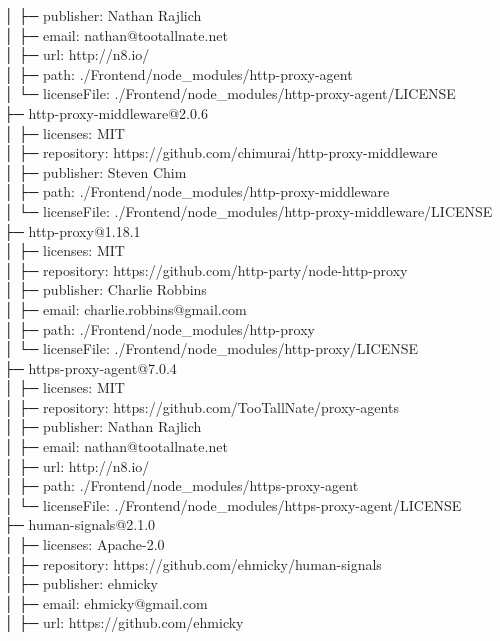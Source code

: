│  ├─ publisher: Nathan Rajlich\\
│  ├─ email: nathan@tootallnate.net\\
│  ├─ url: http://n8.io/\\
│  ├─ path: ./Frontend/node\_modules/http-proxy-agent\\
│  └─ licenseFile: ./Frontend/node\_modules/http-proxy-agent/LICENSE\\
├─ http-proxy-middleware@2.0.6\\
│  ├─ licenses: MIT\\
│  ├─ repository: https://github.com/chimurai/http-proxy-middleware\\
│  ├─ publisher: Steven Chim\\
│  ├─ path: ./Frontend/node\_modules/http-proxy-middleware\\
│  └─ licenseFile: ./Frontend/node\_modules/http-proxy-middleware/LICENSE\\
├─ http-proxy@1.18.1\\
│  ├─ licenses: MIT\\
│  ├─ repository: https://github.com/http-party/node-http-proxy\\
│  ├─ publisher: Charlie Robbins\\
│  ├─ email: charlie.robbins@gmail.com\\
│  ├─ path: ./Frontend/node\_modules/http-proxy\\
│  └─ licenseFile: ./Frontend/node\_modules/http-proxy/LICENSE\\
├─ https-proxy-agent@7.0.4\\
│  ├─ licenses: MIT\\
│  ├─ repository: https://github.com/TooTallNate/proxy-agents\\
│  ├─ publisher: Nathan Rajlich\\
│  ├─ email: nathan@tootallnate.net\\
│  ├─ url: http://n8.io/\\
│  ├─ path: ./Frontend/node\_modules/https-proxy-agent\\
│  └─ licenseFile: ./Frontend/node\_modules/https-proxy-agent/LICENSE\\
├─ human-signals@2.1.0\\
│  ├─ licenses: Apache-2.0\\
│  ├─ repository: https://github.com/ehmicky/human-signals\\
│  ├─ publisher: ehmicky\\
│  ├─ email: ehmicky@gmail.com\\
│  ├─ url: https://github.com/ehmicky\\
